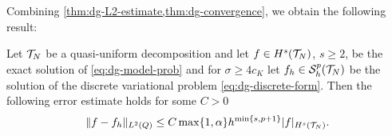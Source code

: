 \documentclass[../thesis.tex]{subfiles}
\begin{document}
Combining \cref{thm:dg-L2-estimate,thm:dg-convergence}, we obtain the following result:
\begin{corollary}
\label{thm:dg-convergence-L2}
Let $\mathcal{T}_N$ be a quasi-uniform decomposition and let $f \in H^s(\mathcal{T}_N)$, $s \geq 2$, be the exact solution of \cref{eq:dg-model-prob} and for $\sigma \geq 4 c_K$ let $f_h \in \mathcal{S}_h^p(\mathcal{T}_N)$ be the solution of the discrete variational problem \cref{eq:dg-discrete-form}.
Then the following error estimate holds for some $C > 0$
\[
	\| f - f_h \|_{L^2(Q)} \leq C \max\{ 1, \alpha \} h^{\min \{ s, p+1\}} |f|_{H^s(\mathcal{T}_N)}.
\]
\end{corollary}
\end{document}
